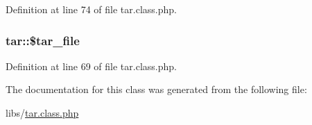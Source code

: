Definition at line 74 of file tar.\-class.\-php.

\hypertarget{classtar_afea782413237d583b7611a1c5410f2c5}{
\subsubsection[{\$tar\-\_\-file}]{\setlength{\rightskip}{0pt plus 5cm}tar\-::\$tar\-\_\-file}}\label{classtar_afea782413237d583b7611a1c5410f2c5}


Definition at line 69 of file tar.\-class.\-php.



The documentation for this class was generated from the following file\-:\begin{DoxyCompactItemize}
\item 
libs/\hyperlink{tar_8class_8php}{tar.\-class.\-php}\end{DoxyCompactItemize}
